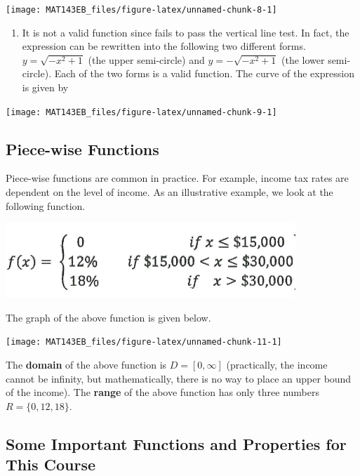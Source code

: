 \documentclass[
]{book}
\providecommand{\tightlist}{%
  \setlength{\itemsep}{0pt}\setlength{\parskip}{0pt}}
\begin{document}
\begin{center}\texttt{[image: MAT143EB\_files/figure-latex/unnamed-chunk-8-1]} \end{center}

\begin{enumerate}
\def\labelenumi{\arabic{enumi}.}
\setcounter{enumi}{2}
\tightlist
\item
  It is not a valid function since fails to pass the vertical line test. In fact, the expression can be rewritten into the following two different forms. \(y = \sqrt{-x^2 + 1}\) (the upper semi-circle) and \(y = -\sqrt{-x^2 +1}\) (the lower semi-circle). Each of the two forms is a valid function. The curve of the expression is given by
\end{enumerate}

\begin{center}\texttt{[image: MAT143EB\_files/figure-latex/unnamed-chunk-9-1]} \end{center}

\hypertarget{piece-wise-functions}{%
\subsection{Piece-wise Functions}\label{piece-wise-functions}}

Piece-wise functions are common in practice. For example, income tax rates are dependent on the level of income. As an illustrative example, we look at the following function.

\begin{center}\includegraphics[width=0.4\linewidth]{img01/w01note05-PiecewiseFun} \end{center}

The graph of the above function is given below.

\begin{center}\texttt{[image: MAT143EB\_files/figure-latex/unnamed-chunk-11-1]} \end{center}

The \textbf{domain} of the above function is \(D = [0, \infty]\) (practically, the income cannot be infinity, but mathematically, there is no way to place an upper bound of the income). The \textbf{range} of the above function has only three numbers \(R = \{ 0, 12, 18\}\).

\hypertarget{some-important-functions-and-properties-for-this-course}{%
\subsection{Some Important Functions and Properties for This Course}\label{some-important-functions-and-properties-for-this-course}}
\end{document}
